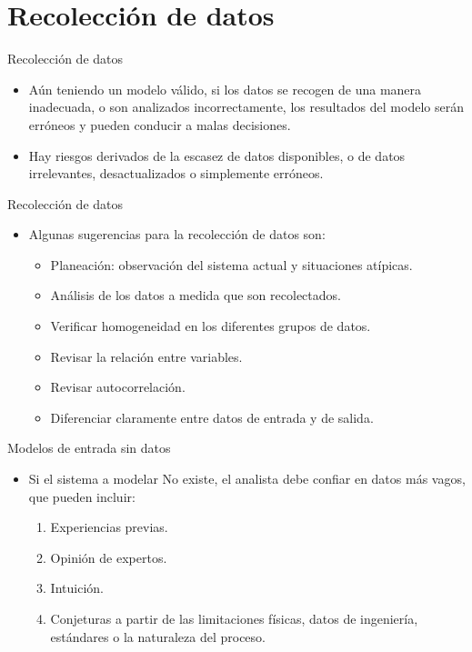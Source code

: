 \section{Recolección de datos}

\begin{frame}{Recolección de datos}
    \begin{itemize}
        \item Aún teniendo un modelo válido, si los datos se recogen de una manera inadecuada, o son analizados incorrectamente, los resultados del modelo serán erróneos y pueden conducir a malas decisiones.
        \item Hay riesgos derivados de la escasez de datos disponibles, o de datos irrelevantes, desactualizados o simplemente erróneos.
    \end{itemize}
\end{frame}


\begin{frame}{Recolección de datos}
    \begin{itemize}
        \item Algunas sugerencias para la recolección de datos son:
    \begin{itemize}
        \item Planeación: observación del sistema actual y situaciones atípicas.
        \item Análisis de los datos a medida que son recolectados.
        \item Verificar homogeneidad en los diferentes grupos de datos.
        \item Revisar la relación entre variables.
        \item Revisar autocorrelación.
        \item Diferenciar claramente entre datos de entrada y de salida.
    \end{itemize}
    \end{itemize}
\end{frame}


\begin{frame}{Modelos de entrada sin datos}
    \begin{itemize}
        \item Si el sistema a modelar No existe, el analista debe confiar en datos más vagos, que pueden incluir:
        \begin{enumerate}
            \item Experiencias previas.
            \item Opinión de expertos.
            \item Intuición.
            \item Conjeturas a partir de las limitaciones físicas, datos de ingeniería, estándares o la naturaleza del proceso.
        \end{enumerate}
    \end{itemize}
\end{frame}

